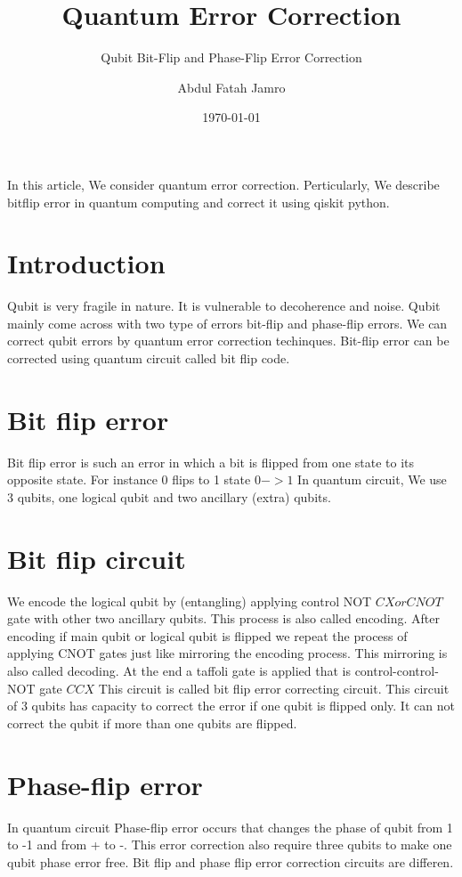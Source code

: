 \documentclass[a4paper, 12pt]{scrartcl}
\title{Quantum Error Correction}
\subtitle{Qubit Bit-Flip and Phase-Flip Error Correction}
\author{Abdul Fatah Jamro}
\date{\today}
\begin{document}
\maketitle
  In this article, We consider quantum error correction. 
  Perticularly, We describe bitflip error in quantum computing 
  and correct it using qiskit python.

\section{Introduction}
  Qubit is very fragile in nature. It is vulnerable to decoherence and noise.
  Qubit mainly come across with two type of errors bit-flip and phase-flip errors.
  We can correct qubit errors by quantum error correction techinques. 
  Bit-flip error can be corrected using quantum circuit called bit flip code.

  \section{Bit flip error}
  Bit flip error is such an error in which a bit is flipped from one state to 
  its opposite state. For instance 0 flips to 1 state $0  -> 1$
  In quantum circuit, We use 3 qubits, one logical qubit and two ancillary (extra) qubits.
\section{Bit flip circuit}
  We encode the logical qubit by (entangling) applying control NOT $CX or CNOT$ gate with other two ancillary qubits.
  This process is also called encoding. After encoding if main qubit or logical qubit is flipped
  we repeat the process of applying CNOT gates just like mirroring the encoding process.
  This mirroring is also called decoding. At the end a taffoli gate is applied that is control-control-NOT gate $CCX$
  This circuit is called bit flip error correcting circuit. This circuit of 3 qubits has capacity 
  to correct the error if one qubit is flipped only. It can not correct the qubit if
  more than one qubits are flipped.
\section{Phase-flip error}
  In quantum circuit Phase-flip error occurs that changes the phase of qubit from 1 to -1 and from + to -.
  This error correction also require three qubits to make one qubit phase error free. Bit flip and phase flip error correction circuits are differen.
\end{document}
